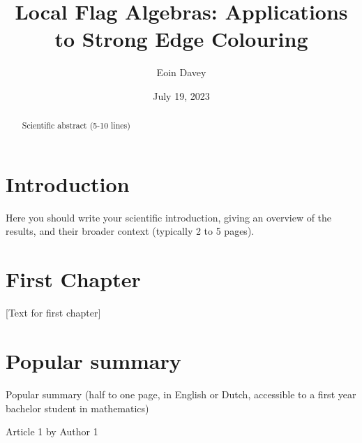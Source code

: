 \documentclass{uvamath}
\title{Local Flag Algebras: Applications to Strong Edge Colouring} %
\author[eoin.davey@student.uva.nl, 14246287]{Eoin Davey} %
\date{July 19, 2023} %
\begin{document}
\maketitle

\begin{abstract}
Scientific abstract (5-10 lines)
\end{abstract}

\tableofcontents

\chapter*{Introduction}
Here you should write your scientific introduction, giving an overview of the results, and their broader context (typically 2 to 5 pages).

\chapter{First Chapter}
[Text for first chapter]


\chapter*{Popular summary}
Popular summary (half to one page, in English or Dutch, accessible to a first year bachelor student in mathematics)


\begin{thebibliography}{10}
 Article 1 by Author 1
 \end{thebibliography}
\end{document}
